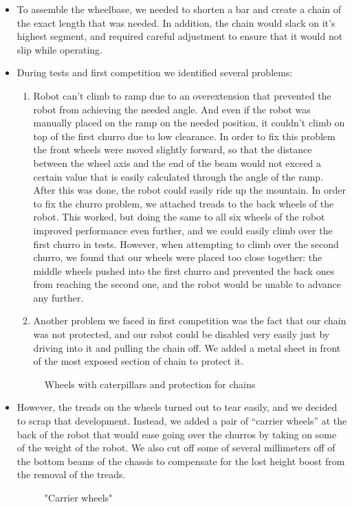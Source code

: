 \begin{itemize}
\item To assemble the wheelbase, we needed to shorten a bar and create a chain of the exact length that was needed. In addition, the chain would slack on it's highest segment, and required careful adjustment to ensure that it would not slip while operating.

\item During tests and first competition we identified several problems:
	\begin{enumerate}
		\item Robot can't climb to ramp due to an overextension that prevented the robot from achieving the needed angle. And even if the robot was manually placed on the ramp on the needed position, it couldn't climb on top of the first churro due to low clearance. In order to fix this problem the front wheels were moved slightly forward, so that the distance between the wheel axis and the end of the beam would not exceed a certain value that is easily calculated through the angle of the ramp. After this was done, the robot could easily ride up the mountain. In order to fix the churro problem, we attached treads to the back wheels of the robot. This worked, but doing the same to all six wheels of the robot improved performance even further, and we could easily climb over the first churro in tests. However, when attempting to climb over the second churro, we found that our wheels were placed too close together:  the middle wheels pushed into the first churro and prevented the back ones from reaching the second one, and the robot would be unable to advance any further.
		
		\item Another problem we faced in first competition was the fact that our chain was not protected, and our robot could be disabled very easily just by driving into it and pulling the chain off. We added a metal sheet in front of the most exposed section of chain to protect it.
		
	\end{enumerate}
	\begin{figure}[H]
		\begin{minipage}[h]{\linewidth}
			\caption{Wheels with caterpillars and protection for chains}
		\end{minipage}
	\end{figure}
	\item However, the treads on the wheels turned out to tear easily, and we decided to scrap that development. Instead, we added a pair of “carrier wheels” at the back of the robot that would ease going over the churros by taking on some of the weight of the robot. We also cut off some of several millimeters off of the bottom beams of the chassis to compensate for the lost height boost from the removal of the treads.
	\begin{figure}[H]
		\begin{minipage}[h]{\linewidth}
			\caption{"Carrier wheels"}
		\end{minipage}
	\end{figure}
	
\end{itemize}
\fillpage
 
